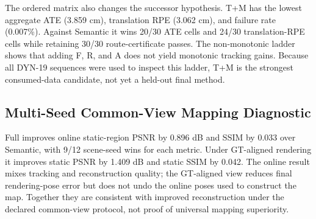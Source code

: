 The ordered matrix also changes the successor hypothesis.
T+M has the lowest aggregate ATE (3.859 cm), translation RPE (3.062 cm), and failure rate (0.007\%).
Against Semantic it wins 20/30 ATE cells and 24/30 translation-RPE cells while retaining 30/30 route-certificate passes.
The non-monotonic ladder shows that adding F, R, and A does not yield monotonic tracking gains.
Because all DYN-19 sequences were used to inspect this ladder, T+M is the strongest consumed-data candidate, not yet a held-out final method.

\subsection{Multi-Seed Common-View Mapping Diagnostic}

\begin{table}[t]
\centering
\caption{DYN-19 common-view mapping metrics. Each row averages 12 scene-seed cells and 240 rendered views. Higher is better.}
\label{tab:dyn19-mapping}
\footnotesize
{}
\end{table}

Full improves online static-region PSNR by 0.896 dB and SSIM by 0.033 over Semantic, with 9/12 scene-seed wins for each metric.
Under GT-aligned rendering it improves static PSNR by 1.409 dB and static SSIM by 0.042.
The online result mixes tracking and reconstruction quality; the GT-aligned view reduces final rendering-pose error but does not undo the online poses used to construct the map.
Together they are consistent with improved reconstruction under the declared common-view protocol, not proof of universal mapping superiority.

